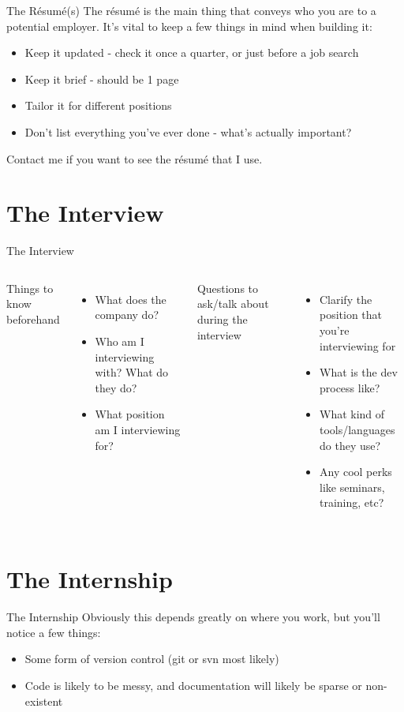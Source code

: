 \documentclass{beamer}
\begin{document}
\begin{frame}{The R\'esum\'e(s)}
  The r\'esum\'e is the main thing that conveys who you are to a potential
  employer. It's vital to keep a few things in mind when building it:

  \begin{itemize}
    \item Keep it updated - check it once a quarter, or just before a job
          search
    \item Keep it brief - should be 1 page
    \item Tailor it for different positions
    \item Don't list everything you've ever done - what's actually important?
  \end{itemize}

  Contact me if you want to see the r\'esum\'e that I use.
\end{frame}

\section{The Interview}
\begin{frame}{The Interview}
  \begin{columns}[t]
    Things to know beforehand
    \begin{itemize}
      \item What does the company do?
      \item Who am I interviewing with? What do they do?
      \item What position am I interviewing for?
    \end{itemize}
    Questions to ask/talk about during the interview
    \begin{itemize}
      \item Clarify the position that you're interviewing for
      \item What is the dev process like?
      \item What kind of tools/languages do they use?
      \item Any cool perks like seminars, training, etc?
    \end{itemize}
    \end{columns}

\end{frame}

\section{The Internship}
\begin{frame}{The Internship}
Obviously this depends greatly on where you work, but you'll notice a few things:
\begin{itemize}
  \item Some form of version control (git or svn most likely)
  \item Code is likely to be messy, and documentation will likely be sparse or
        non-existent

\end{itemize}

\end{frame}
\end{document}
